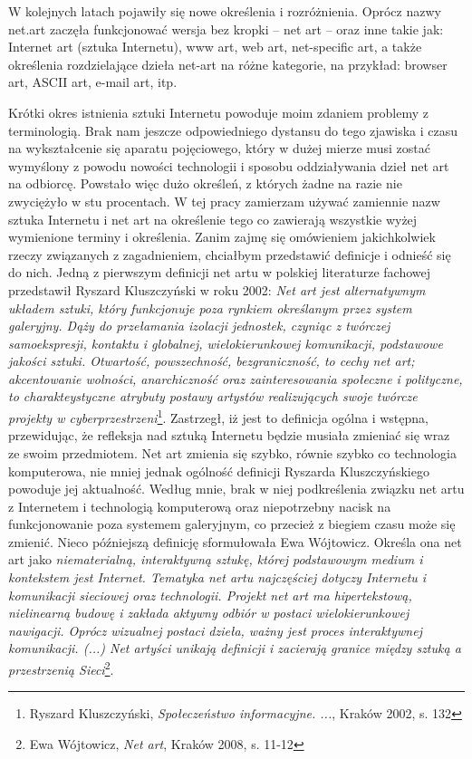 \documentclass[a4paper,12pt,twoside]{article}
\begin{document}
W kolejnych latach pojawiły się nowe określenia i rozróżnienia.
Oprócz nazwy net.art zaczęła funkcjonować wersja bez kropki -- net art --
oraz inne takie jak: Internet art (sztuka Internetu), www art, web art,
net-specific art, a także określenia rozdzielające dzieła net-art
na różne kategorie, na przykład: browser art, ASCII art, e-mail art, itp.

Krótki okres istnienia sztuki Internetu powoduje moim zdaniem problemy
z terminologią. Brak nam jeszcze odpowiedniego dystansu do tego zjawiska
i czasu na wykształcenie się aparatu pojęciowego, który w dużej mierze
musi zostać wymyślony z powodu nowości technologii i sposobu oddziaływania
dzieł net art na odbiorcę. Powstało więc dużo określeń, z których żadne
na razie nie zwyciężyło w stu procentach.
W tej pracy zamierzam używać zamiennie nazw sztuka Internetu i net art
na określenie tego co zawierają wszystkie wyżej wymienione terminy
i określenia. Zanim zajmę się omówieniem jakichkolwiek rzeczy związanych
z zagadnieniem, chciałbym przedstawić definicje i odnieść się do nich.
Jedną z pierwszym definicji net artu
w polskiej literaturze fachowej przedstawił Ryszard Kluszczyński w roku 2002:
\textit{Net art jest alternatywnym układem sztuki, który funkcjonuje
poza rynkiem określanym przez system galeryjny. Dąży do przełamania
izolacji jednostek, czyniąc z twórczej samoekspresji, kontaktu i globalnej,
wielokierunkowej komunikacji, podstawowe jakości sztuki. Otwartość,
powszechność, bezgraniczność, to cechy net art; akcentowanie wolności,
anarchiczność oraz zainteresowania społeczne i polityczne, to charakteystyczne
atrybuty postawy artystów realizujących swoje twórcze projekty
w cyberprzestrzeni}\footnote{Ryszard Kluszczyński,
\textit{Społeczeństwo informacyjne. ...}, Kraków 2002, s. 132}.
Zastrzegł, iż jest to definicja ogólna i wstępna, przewidując, że refleksja
nad sztuką Internetu będzie musiała zmieniać się wraz ze swoim przedmiotem.
Net art zmienia się szybko, równie szybko co technologia komputerowa,
nie mniej jednak ogólność definicji Ryszarda Kluszczyńskiego powoduje
jej aktualność. Według mnie, brak w niej podkreślenia związku net artu
z Internetem i technologią komputerową oraz niepotrzebny nacisk na
funkcjonowanie poza systemem galeryjnym, co przecież z biegiem czasu
może się zmienić.
Nieco późniejszą definicję sformułowała Ewa Wójtowicz. Określa ona net art
jako %
\textit{niematerialną, interaktywną sztukę, której podstawowym
medium i kontekstem jest Internet. Tematyka net artu najczęściej dotyczy
Internetu i komunikacji sieciowej oraz technologii. Projekt net art ma
hipertekstową, nielinearną budowę i zakłada aktywny odbiór w postaci
wielokierunkowej nawigacji. Oprócz wizualnej postaci dzieła, ważny jest
proces interaktywnej komunikacji. (...) Net artyści unikają definicji
i zacierają granice między sztuką a przestrzenią
Sieci}\footnote{Ewa Wójtowicz, \textit{Net art}, Kraków 2008, s. 11-12}.
\end{document}
